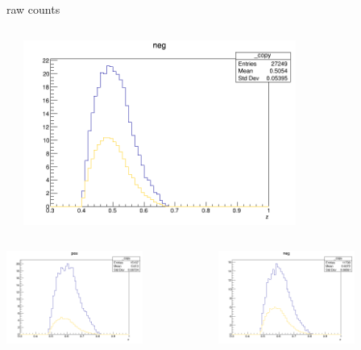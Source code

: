 \begin{frame}{raw counts}
\begin{columns}
\begin{column}[T]{0.25\textwidth}
\end{column}
\begin{column}[T]{0.25\textwidth}
\includegraphics[width = 0.7\textwidth]{results/yield/statistics/yield_x_Q2_z_0.50_3.979_0.50_neg.png}
\end{column}
\end{columns}
\begin{columns}
\begin{column}[T]{0.25\textwidth}
\includegraphics[width = 0.7\textwidth]{results/yield/statistics/yield_x_Q2_z_0.50_3.979_0.60_pos.png}
\end{column}
\begin{column}[T]{0.25\textwidth}
\includegraphics[width = 0.7\textwidth]{results/yield/statistics/yield_x_Q2_z_0.50_3.979_0.60_neg.png}

\end{column}
\end{columns}
\end{frame}
